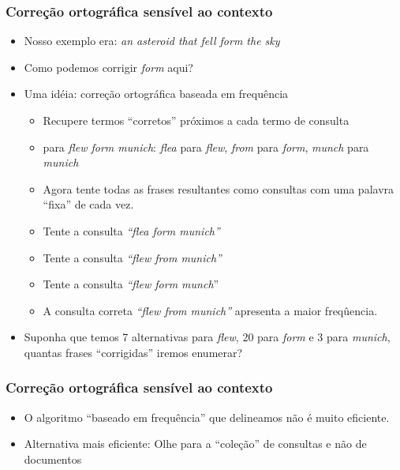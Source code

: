 \documentclass[compress]{beamer}
\begin{document}
\begin{frame}[<+->]
\frametitle{Correção ortográfica sensível ao contexto}
\pause[2]
\begin{itemize}
\item Nosso exemplo era: \emph{an asteroid that fell 
{\color{blue} form} the sky}
\item Como podemos corrigir \emph{form} aqui?
\item Uma idéia: correção ortográfica {\color{blue} baseada em frequência} 

\begin{itemize}
\item Recupere termos ``corretos'' próximos a cada termo de consulta
\item para \emph{flew form munich}: \emph{flea} para
  \emph{flew}, \emph{from} para \emph{form}, \emph{munch}
  para \emph{munich}
\item Agora tente todas as frases resultantes como consultas com uma palavra 
``fixa'' de cada vez.
\item Tente a consulta \emph{``flea form munich''}
\item Tente a consulta \emph{``flew from munich''}
\item Tente a consulta \emph{``flew form munch}''
\item A consulta correta \emph{``flew from munich''} apresenta a maior 
freqûencia.
\end{itemize}
\item {\color{green} Suponha que temos 7 alternativas para
  \emph{flew}, 20 para \emph{form} e 3 para \emph{munich},
  quantas frases ``corrigidas'' iremos enumerar?}
\end{itemize}
\end{frame}


\begin{frame}[<+->]
\frametitle{Correção ortográfica sensível ao contexto}
\pause[2]
\begin{itemize}
\item O algoritmo ``baseado em frequência'' que delineamos não é muito 
eficiente.
\item Alternativa mais eficiente: Olhe para a ``coleção'' de consultas e não de 
documentos
\end{itemize}
\end{frame}
\end{document}
